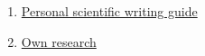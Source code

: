 \begin{enumerate}
    \item \href{https://www.overleaf.com/read/dhnssnrrxbvh#5cc69e}{Personal scientific writing guide}
    \item \href{https://survivejs.com/research/}{Own research}
\end{enumerate}
